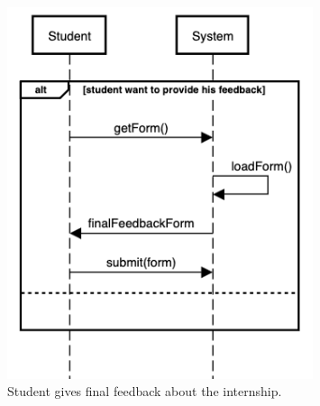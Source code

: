     \begin{figure}[H]
        \centering
        \includegraphics[width=0.8\textwidth]{RASD/Assets/SequenceDiagrams/7-internship-final-form.png}
        \caption{Student gives final feedback about the internship.}
        \label{fig:Student gives final feedback about the internship}
    \end{figure}


